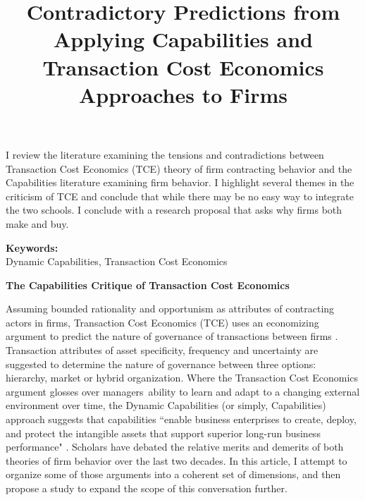 \documentclass[12pt,letterpaper]{article}
\begin{document}
\title{Contradictory Predictions from Applying Capabilities and Transaction Cost Economics Approaches to Firms}
\date{}
\maketitle

\begin{abstract} 
\normalsize 

\end{abstract}
I review the literature examining the tensions and contradictions between Transaction Cost Economics (TCE) theory of firm contracting behavior and the Capabilities literature examining firm behavior. I highlight several themes in the criticism of TCE and conclude that while there may be no easy way to integrate the two schools. I conclude with a research proposal that asks why firms both make and buy.

{\textbf{Keywords:} \\\indent Dynamic Capabilities, Transaction Cost Economics}

\newpage
\pagestyle{fancy}
\fancyhf{}
\rhead{\thepage}

\begin{center}
\textbf{The Capabilities Critique of Transaction Cost Economics}
\end{center}

Assuming bounded rationality and opportunism as attributes of contracting actors in firms, Transaction Cost Economics (TCE) uses an economizing argument to predict the nature of governance of transactions between firms \citep{Williamson1985}.  Transaction attributes of asset specificity, frequency and uncertainty are suggested to determine the nature of governance between three options: hierarchy, market or hybrid organization. Where the Transaction Cost Economics argument glosses over managers\textquotesingle \ ability to learn and adapt to a changing external environment over time, the Dynamic Capabilities (or simply, Capabilities) approach suggests that capabilities ``enable business enterprises to create, deploy, and protect the intangible assets that support superior long-run business performance" \citep{Teece2007}. Scholars have debated the relative merits and demerits of both theories of firm behavior over the last two decades. In this article, I attempt to organize some of those arguments into a coherent set of dimensions, and then propose a study to expand the scope of this conversation further.
\end{document}
